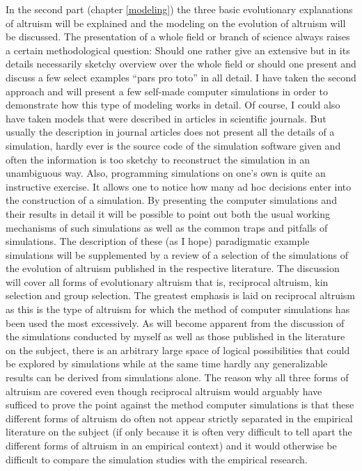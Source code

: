 In the second part (chapter \ref{modeling}) the three basic evolutionary
explanations of altruism will be explained and the modeling on the evolution
of altruism will be discussed. The presentation of a whole field or branch of
science always raises a certain methodological question: Should one rather
give an extensive but in its details necessarily sketchy overview over the
whole field or should one present and discuss a few select examples ``pars pro
toto'' in all detail.  I have taken the second approach and will present a few
self-made computer simulations in order to demonstrate how this type of
modeling works in detail.  Of course, I could also have taken models that were
described in articles in scientific journals. But usually the description in
journal articles does not present all the details of a simulation, hardly ever
is the source code of the simulation software given and often the information
is too sketchy to reconstruct the simulation in an unambiguous way. Also,
programming simulations on one's own is quite an instructive exercise. It
allows one to notice how many ad hoc decisions enter into the construction of
a simulation.  By presenting the computer simulations and their results in
detail it will be possible to point out both the usual working mechanisms of
such simulations as well as the common traps and pitfalls of simulations. The
description of these (as I hope) paradigmatic example simulations will be
supplemented by a review of a selection of the simulations of the evolution of
altruism published in the respective literature. The discussion will cover all forms of evolutionary altruism that is, reciprocal
altruism, kin selection and group selection.  The greatest emphasis is laid on
reciprocal altruism as this is the type of altruism for which the method of
computer simulations has been used the most excessively. As will become
apparent from the discussion of the simulations conducted by myself as well as
those published in the literature on the subject, there is an arbitrary large
space of logical possibilities that could be explored by simulations while at
the same time hardly any generalizable results can be derived from simulations
alone. The reason why all three forms of altruism are covered even though
reciprocal altruism would arguably have sufficed to prove the point against
the method computer simulations is that these different forms of altruism do
often not appear strictly separated in the empirical literature on the subject
(if only because it is often very difficult to tell apart the different forms
of altruism in an empirical context) and it would otherwise be difficult to
compare the simulation studies with the empirical research.

